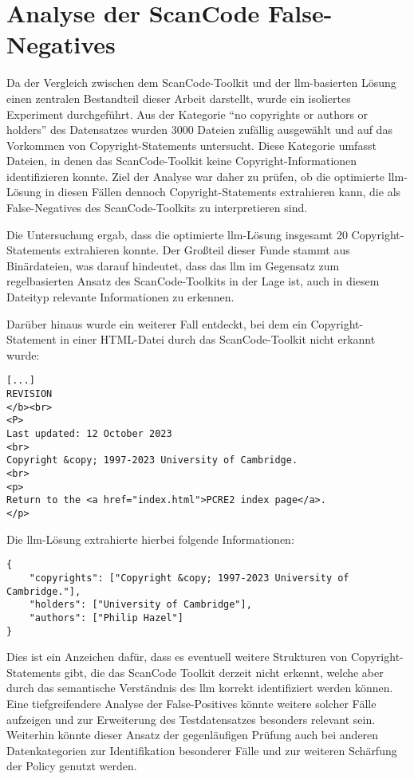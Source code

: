 
\section{Analyse der ScanCode False-Negatives}

Da der Vergleich zwischen dem ScanCode-Toolkit und der \gls{llm}-basierten Lösung einen zentralen Bestandteil dieser Arbeit darstellt, wurde ein isoliertes Experiment durchgeführt.
Aus der Kategorie \enquote{no copyrights or authors or holders} des Datensatzes wurden \num{3000} Dateien zufällig ausgewählt und auf das Vorkommen von Copyright-Statements untersucht.
Diese Kategorie umfasst Dateien, in denen das ScanCode-Toolkit keine Copyright-Informationen identifizieren konnte.
Ziel der Analyse war daher zu prüfen, ob die optimierte \gls{llm}-Lösung in diesen Fällen dennoch Copyright-Statements extrahieren kann, die als False-Negatives des ScanCode-Toolkits zu interpretieren sind.

Die Untersuchung ergab, dass die optimierte \gls{llm}-Lösung insgesamt \num{20} Copyright-Statements extrahieren konnte.
Der Großteil dieser Funde stammt aus Binärdateien, was darauf hindeutet, dass das \gls{llm} im Gegensatz zum regelbasierten Ansatz des ScanCode-Toolkits in der Lage ist, auch in diesem Dateityp relevante Informationen zu erkennen.

Darüber hinaus wurde ein weiterer Fall entdeckt, bei dem ein Copyright-Statement in einer HTML-Datei durch das ScanCode-Toolkit nicht erkannt wurde:

\begin{lstlisting}[keepspaces=true]
[...]
REVISION
</b><br>
<P>
Last updated: 12 October 2023
<br>
Copyright &copy; 1997-2023 University of Cambridge.
<br>
<p>
Return to the <a href="index.html">PCRE2 index page</a>.
</p>
\end{lstlisting}

Die \gls{llm}-Lösung extrahierte hierbei folgende Informationen:

\begin{lstlisting}[keepspaces=true]
{
    "copyrights": ["Copyright &copy; 1997-2023 University of Cambridge."],
    "holders": ["University of Cambridge"],
    "authors": ["Philip Hazel"]
}
\end{lstlisting}

Dies ist ein Anzeichen dafür, dass es eventuell weitere Strukturen von Copyright-Statements gibt, die das ScanCode Toolkit derzeit nicht erkennt, welche aber durch das semantische Verständnis des \gls{llm} korrekt identifiziert werden können.
Eine tiefgreifendere Analyse der False-Positives könnte weitere solcher Fälle aufzeigen und zur Erweiterung des Testdatensatzes besonders relevant sein.
Weiterhin könnte dieser Ansatz der gegenläufigen Prüfung auch bei anderen Datenkategorien zur Identifikation besonderer Fälle und zur weiteren Schärfung der Policy genutzt werden.